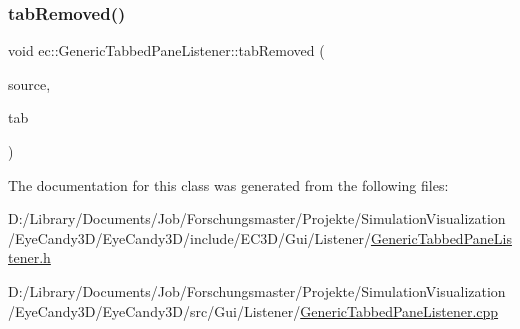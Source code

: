 \subsubsection{\texorpdfstring{tab\+Removed()}{tabRemoved()}}
{\footnotesize\ttfamily void ec\+::\+Generic\+Tabbed\+Pane\+Listener\+::tab\+Removed (\begin{DoxyParamCaption}\item[{agui\+::\+Tabbed\+Pane $\ast$}]{source,  }\item[{agui\+::\+Tab $\ast$}]{tab }\end{DoxyParamCaption})\hspace{0.3cm}{\ttfamily [override]}}



The documentation for this class was generated from the following files\+:\begin{DoxyCompactItemize}
\item 
D\+:/\+Library/\+Documents/\+Job/\+Forschungsmaster/\+Projekte/\+Simulation\+Visualization/\+Eye\+Candy3\+D/\+Eye\+Candy3\+D/include/\+E\+C3\+D/\+Gui/\+Listener/\mbox{\hyperlink{_generic_tabbed_pane_listener_8h}{Generic\+Tabbed\+Pane\+Listener.\+h}}\item 
D\+:/\+Library/\+Documents/\+Job/\+Forschungsmaster/\+Projekte/\+Simulation\+Visualization/\+Eye\+Candy3\+D/\+Eye\+Candy3\+D/src/\+Gui/\+Listener/\mbox{\hyperlink{_generic_tabbed_pane_listener_8cpp}{Generic\+Tabbed\+Pane\+Listener.\+cpp}}\end{DoxyCompactItemize}
